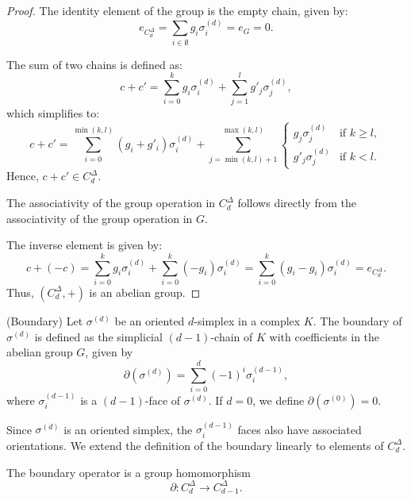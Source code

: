 \begin{proof}
	The identity element of the group is the empty chain, given by:
	\[
		e_{C^{\Delta}_d}= \sum_{i \in \emptyset}g_{i} \sigma_{i}^{(d)}= e_{G} = 0.
	\]

	The sum of two chains is defined as:
	\[
		c + c' = \sum_{i=0}^{k}g_{i} \sigma_{i}^{(d)}+ \sum_{j=1}^{l}g'_{j} \sigma_{j}
		^{(d)},
	\]
	which simplifies to:
	\[
		c + c' = \sum_{i=0}^{\min(k, l)}(g_{i} + g'_{i}) \sigma_{i}^{(d)}+ \sum_{j=\min(k,
		l)+1}^{\max(k, l)}
		\begin{cases}
			g_{j} \sigma_{j}^{(d)}  & \text{if }k \geq l, \\
			g'_{j} \sigma_{j}^{(d)} & \text{if }k < l.
		\end{cases}
	\]
	Hence, $c + c' \in C^{\Delta}_{d}$.

	The associativity of the group operation in $C^{\Delta}_{d}$ follows directly from
	the associativity of the group operation in $G$.

	The inverse element is given by:
	\[
		c + (-c) = \sum_{i=0}^{k}g_{i} \sigma_{i}^{(d)}+ \sum_{i=0}^{k}(-g_{i}) \sigma
		_{i}^{(d)}= \sum_{i=0}^{k}(g_{i} - g_{i}) \sigma_{i}^{(d)}= e_{C^{\Delta}_d}.
	\]
	Thus, $(C^{\Delta}_{d}, +)$ is an abelian group.
\end{proof}

\begin{definition}
	{(Boundary) \cite[p.106]{hatcher2005algebraic}} Let $\sigma^{(d)}$ be an oriented
	$d$-simplex in a complex $K$. The boundary of $\sigma^{(d)}$ is defined as the
	simplicial $(d-1)$-chain of $K$ with coefficients in the abelian group $G$, given
	by
	\begin{equation}
		\partial(\sigma^{(d)}) = \sum_{i=0}^{d}(-1)^{i} \sigma^{(d-1)}_{i},
	\end{equation}
	where $\sigma^{(d-1)}_{i}$ is a $(d-1)$-face of $\sigma^{(d)}$. If $d = 0$, we
	define $\partial(\sigma^{(0)}) = 0$.
\end{definition}

Since $\sigma^{(d)}$ is an oriented simplex, the $\sigma^{(d-1)}_{i}$ faces also
have associated orientations. We extend the definition of the boundary linearly to
elements of $C^{\Delta}_{d}$.

\begin{lemma}
	The boundary operator is a group homomorphism
	\[
		\partial: C^{\Delta}_{d} \to C^{\Delta}_{d-1}.
	\]
\end{lemma}

